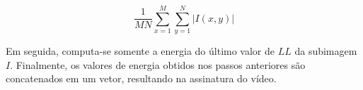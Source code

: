  \begin{equation}
	\label{eq:bandasH}
	\frac{1}{MN}\sum_{x=1}^M \sum_{y=1}^N |I(x,y)|
\end{equation} 
 
 
 

 Em seguida, computa-se somente a energia do último valor de $LL$ da subimagem $I$. Finalmente, os valores de energia obtidos nos passos anteriores são concatenados em um vetor, resultando na assinatura do vídeo.






